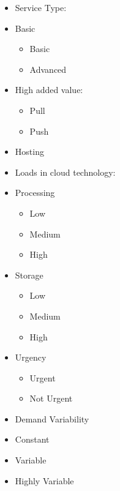 \documentclass[a4paper]{article}
\newcommand\liststyleLFOxxxvii{%
\renewcommand\labelitemi{[F0B7?]}
\renewcommand\labelitemii{o}
\renewcommand\labelitemiii{[F0A7?]}
\renewcommand\labelitemiv{[F0B7?]}
}
\newcommand\liststyleLFOxxxvi{%
\renewcommand\labelitemi{{}-}
\renewcommand\labelitemii{o}
\renewcommand\labelitemiii{[F0A7?]}
\renewcommand\labelitemiv{[F0B7?]}
}
\begin{document}
\bigskip

\liststyleLFOxxxvii
\begin{itemize}
\item Service Type:
\end{itemize}
\liststyleLFOxxxvi
\begin{itemize}
\item Basic

\begin{itemize}
\item Basic
\item Advanced
\end{itemize}
\item High added value:

\begin{itemize}
\item Pull\ 
\item Push
\end{itemize}
\item Hosting
\end{itemize}

\bigskip

\liststyleLFOxxxvii
\begin{itemize}
\item Loads in cloud technology:
\end{itemize}
\liststyleLFOxxxvi
\begin{itemize}
\item Processing

\begin{itemize}
\item Low
\item Medium
\item High
\end{itemize}
\item Storage

\begin{itemize}
\item Low\ 
\item Medium
\item High
\end{itemize}
\item Urgency

\begin{itemize}
\item Urgent
\item Not Urgent
\end{itemize}
\end{itemize}
\liststyleLFOxxxvii
\begin{itemize}
\item Demand Variability
\end{itemize}
\liststyleLFOxxxvi
\begin{itemize}
\item Constant
\item Variable
\item Highly Variable
\end{itemize}
\end{document}
